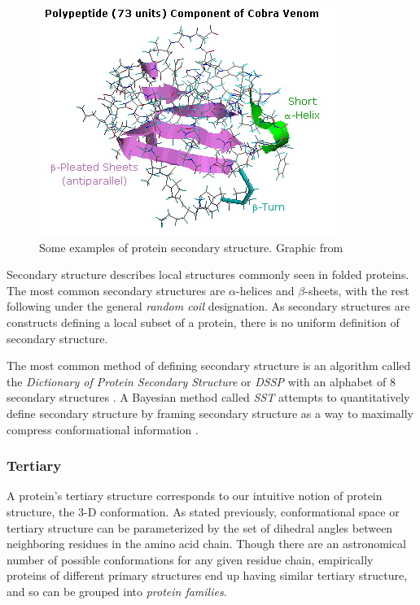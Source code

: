 \documentclass{article}
\begin{document}
\begin{figure}[!h]
  \includegraphics[width=\linewidth]{images/secondary_structure.jpg}
  \caption{Some examples of protein secondary structure. Graphic from \cite{secondaryStructure}}
  \label{fig:secondaryStructure}
\end{figure}

Secondary structure describes local structures commonly seen in folded proteins. The most common secondary structures are $\alpha$-helices and $\beta$-sheets, with the rest following under the general \textit{random coil} designation. As secondary structures are constructs defining a local subset of a protein, there is no uniform definition of secondary structure. 

The most common method of defining secondary structure is an algorithm called the \textit{Dictionary of Protein Secondary Structure} or \textit{DSSP} with an alphabet of 8 secondary structures \cite{dssp}. A Bayesian method called \textit{SST} attempts to quantitatively define secondary structure by framing secondary structure as a way to maximally compress conformational information \cite{sst}.

\subsubsection{Tertiary}
A protein's tertiary structure corresponds to our intuitive notion of protein structure, the 3-D conformation. As stated previously, conformational space or tertiary structure can be parameterized by the set of dihedral angles between neighboring residues in the amino acid chain. Though there are an astronomical number of possible conformations for any given residue chain, empirically proteins of different primary structures end up having similar tertiary structure, and so can be grouped into \textit{protein families}. 
\end{document}
